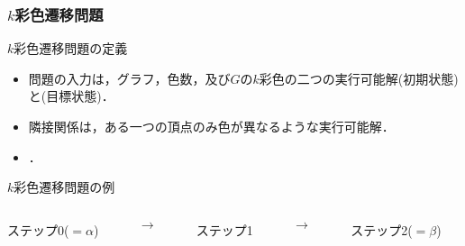 \documentclass[dvipdfmx,11pt]{beamer}
\begin{document}
\begin{frame}\frametitle{$k$彩色遷移問題}

  \begin{block}{$k$彩色遷移問題の定義}
    \begin{itemize}
      \item 問題の入力は，グラフ，色数，及び$G$の$k$彩色の二つの実行可能解\structure{$\alpha$}(初期状態)と\structure{$\beta$}(目標状態)．
      \item 隣接関係は，ある一つの頂点のみ色が異なるような実行可能解．
      \item {}．
    \end{itemize}
  \end{block}

  \begin{exampleblock}{$k$彩色遷移問題の例}
    \begin{columns}
      \begin{column}{0.3\textwidth}
        \centering
        
        ステップ0($=\alpha$)
      \end{column}
      \begin{column}{0.05\textwidth}
        \textbf{$\longrightarrow$}
      \end{column}
      \begin{column}[]{0.3\textwidth}
        \centering
        
        ステップ1
      \end{column}
      \begin{column}{0.05\textwidth}
        \textbf{$\longrightarrow$}
      \end{column}
      \begin{column}{0.3\textwidth}
        \centering
        
        ステップ2($=\beta$)
      \end{column}
    \end{columns}
  \end{exampleblock}
  
\end{frame}

\end{document}
